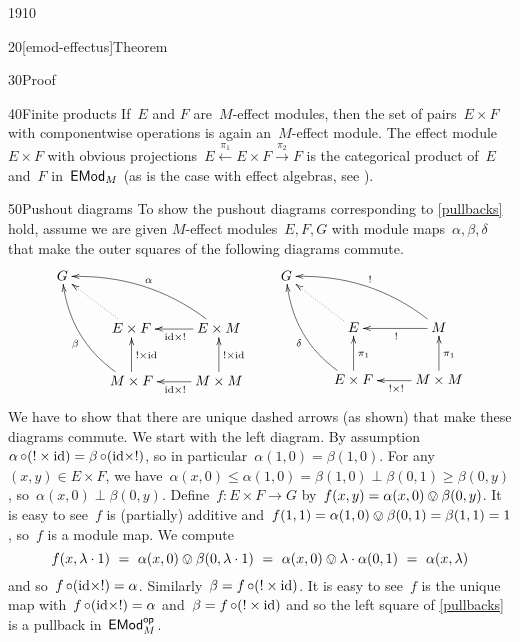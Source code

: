 \begin{parsec}{1910}
\begin{point}{20}[emod-effectus]{Theorem}
\begin{point}{30}{Proof}
\begin{point}{40}{Finite products}
If~$E$ and $F$ are~$M$-effect modules,
    then the set of pairs~$E \times F$
    with componentwise operations
    is again an~$M$-effect module.
The effect module~$E \times F$
    with obvious projections~$E \xleftarrow{\pi_1} E \times F \xrightarrow{\pi_2} F$
    is the categorical product of~$E$ and~$F$ in~$\mathsf{EMod}_M$
    (as is the case with effect algebras, see ).
\end{point}
\begin{point}{50}{Pushout diagrams}%
To show the pushout diagrams corresponding to \eqref{pullbacks} hold,
assume we are given $M$-effect modules~$E,F,G$
    with module maps~$\alpha,\beta,\delta$
    that make the  outer squares of the following diagrams commute.
\begin{equation*}
    \xymatrix{
    G\\
    & E \times F \ar@{.>}[lu]
    & E \times M \ar[l]^{\id\times !}
    \ar@/_1pc/[llu]_{\alpha}
    \\& M \times F \ar[u]_{! \times \id}
    \ar@/^1pc/[luu]^{\beta}
    & M \times M \ar[l]^{\id\times!} \ar[u]_{! \times \id}
    } \qquad
    \xymatrix{
    G\\
    & E \ar@{.>}[lu]
    & M \ar[l]^{!}
    \ar@/_1pc/[llu]_{!}
    \\& E \times F \ar[u]_{\pi_1}
    \ar@/^1pc/[luu]^{\delta}
    & M \times M \ar[l]^{!\times!} \ar[u]_{\pi_1}
    }
\end{equation*}
    We have to show that there are unique dashed arrows (as shown)
    that make these diagrams commute.
We start with the left diagram.
By assumption~$\alpha \mathop{\circ} (! \times \mathrm{id}) = \beta \mathop{\circ} (\mathrm{id} \times !)$,
    so in particular~$\alpha(1,0) = \beta(1,0)$.
    For any~$(x,y) \in E \times F$,
        we have~$\alpha(x,0) \leq \alpha(1,0) = \beta(1,0)
            \perp \beta(0,1) \geq \beta(0,y)$,
            so~$\alpha(x,0) \perp \beta(0,y)$.
Define~$f\colon E\times F \to G$
    by~$f(x,y) = \alpha(x,0) \ovee \beta(0,y)$.
    It is easy to see~$f$ is (partially) additive
    and~$f(1,1) = \alpha(1,0) \ovee \beta(0,1) = \beta(1,1)=1$,
    so~$f$ is a module map.
We compute
\begin{equation*}
    f(x, \lambda \cdot 1)
\ = \ \alpha(x,0) \ovee \beta(0,\lambda \cdot 1)
\ = \ \alpha(x,0) \ovee \lambda \cdot \alpha(0, 1)
\ = \ \alpha(x,\lambda)
\end{equation*}
and so~$f \mathop{\circ} (\mathrm{id} \times !) = \alpha$.
Similarly~$\beta = f \mathop{\circ} (! \times \mathrm{id})$.
It is easy to see~$f$
is the unique map with~$f \mathop{\circ} (\mathrm{id} \times !) = \alpha$
and~$\beta = f \mathop{\circ} (! \times \mathrm{id})$
and so the left square of \eqref{pullbacks}
    is a pullback in~$\mathsf{EMod}_M^{\mathsf{op}}$.


\end{point}
\end{point}
\end{point}
\end{parsec}
